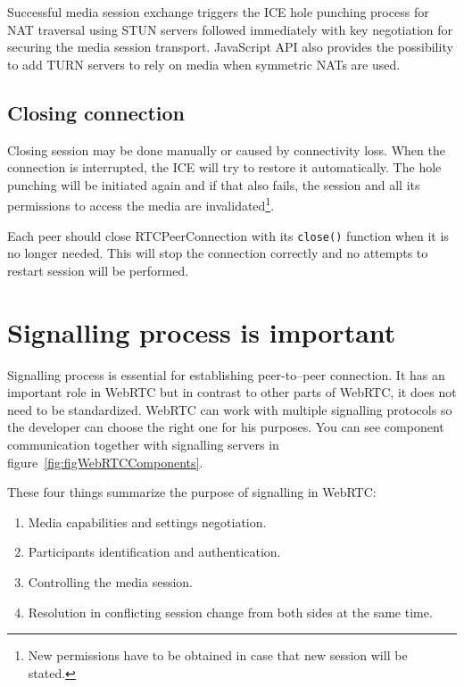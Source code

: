 Successful media session exchange triggers the ICE hole punching process for NAT traversal using STUN servers followed immediately with key negotiation for securing the media session transport. JavaScript API also provides the possibility to add TURN servers to rely on media when symmetric NATs are used.

\subsection{Closing connection}
Closing session may be done manually or caused by connectivity loss. When the connection is interrupted, the ICE will try to restore it automatically. The hole punching will be initiated again and if that also fails, the session and all its permissions to access the media are invalidated\footnote{New permissions have to be obtained in case that new session will be stated.}.

Each peer should close RTCPeerConnection with its \verb|close()| function when it is no longer needed. This will stop the connection correctly and no attempts to restart session will be performed.









\section{Signalling process is important}
\label{sec:webrtc-signalling}
Signalling process is essential for establishing peer-to--peer connection. It has an important role in WebRTC but in contrast to other parts of WebRTC, it does not need to be standardized. WebRTC can work with multiple signalling protocols so the developer can choose the right one for his purposes. You can see component communication together with signalling servers in figure~\ref{fig:figWebRTCComponents}.


\noindent
These four things summarize the purpose of signalling in WebRTC:

\begin{enumerate}
  \item Media capabilities and settings negotiation.
  \item Participants identification and authentication.
  \item Controlling the media session.
  \item Resolution in conflicting session change from both sides at the same time.
\end{enumerate}

